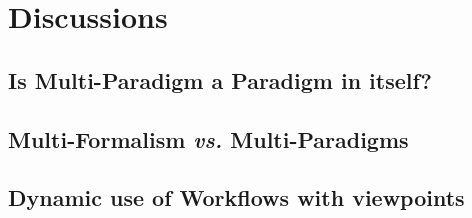 \section{Discussions}
\label{sec:Discussions}



\subsection{Is Multi-Paradigm a Paradigm in itself?}
\label{sec:Discussion-Multiparadigm}

\subsection{Multi-Formalism \emph{vs.} Multi-Paradigms}
\label{sec:Discussion-MFvsMP}

\subsection{Dynamic use of Workflows with viewpoints}
\label{sec:Discussion-Dynamic}